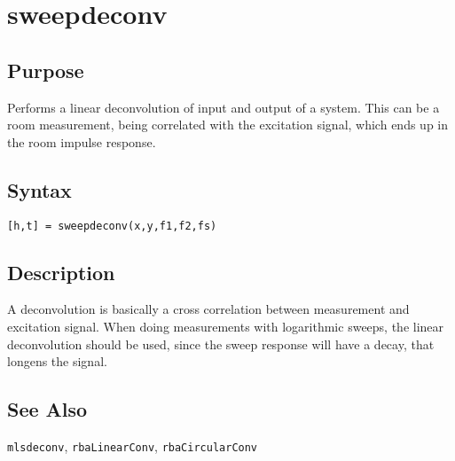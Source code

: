 
\chapter{sweepdeconv} %
\label{cha:sweepdeconv} %

\section{Purpose} %
\label{sec:sweepdeconv_purpose}
Performs a linear deconvolution of input and output of a system. This can be a room measurement, being correlated with the excitation signal, which ends up in the room impulse response.

\section{Syntax} %
\label{sec:sweepdeconv_syntax}

\texttt{[h,t] = sweepdeconv(x,y,f1,f2,fs)}


\section{Description} %
\label{sec:sweepdeconv_description}

A deconvolution is basically a cross correlation between measurement and excitation signal. When doing measurements with logarithmic sweeps, the linear deconvolution should be used, since the sweep response will have a decay, that longens the signal.


\section{See Also} %
\label{sec:sweepdeconv_see_also}

\texttt{mlsdeconv}, \texttt{rbaLinearConv}, \texttt{rbaCircularConv}
\underline{}

